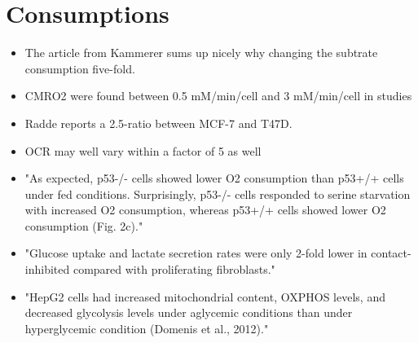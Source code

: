 \documentclass[11pt,a4paper]{article}
\begin{document}
\section{Consumptions}
\begin{itemize}
\item The article from Kammerer sums up nicely why changing the subtrate consumption five-fold.
\item CMRO2 were found between 0.5 mM/min/cell and 3 mM/min/cell in studies \cite{Rhodes1983}\cite{Shalit1972}\cite{Kirsch1978}
\item Radde reports a 2.5-ratio between MCF-7 and T47D.
\item OCR may well vary within a factor of 5 as well 
\item "As expected, p53-/- cells showed lower O2 consumption than p53+/+ cells under fed conditions. Surprisingly, p53-/- cells responded to serine starvation with increased O2 consumption, whereas p53+/+ cells showed lower O2 consumption (Fig. 2c)."\cite{Maddocks2012}
\item "Glucose uptake and lactate secretion rates were only 2-fold lower in contact-inhibited compared with proliferating fibroblasts."\cite{Valcourt2012}
\item "HepG2 cells had increased mitochondrial content, OXPHOS levels, and decreased glycolysis levels under aglycemic conditions than under hyperglycemic condition (Domenis et al., 2012)."\cite{Zhang2023}


\end{itemize}
\end{document}
